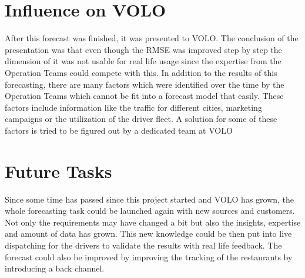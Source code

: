 \section{Influence on VOLO}
After this forecast was finished, it was presented to VOLO. The conclusion of the presentation was that even though the RMSE was improved step by step the dimension of it was not usable for real life usage since the expertise from the Operation Teams could compete with this.\newline
In addition to the results of this forecasting, there are many factors which were identified over the time by the Operation Teams which cannot be fit into a forecast model that easily. These factors include information like the traffic for different cities, marketing campaigns or the utilization of the driver fleet. A solution for some of these factors is tried to be figured out by a dedicated team at VOLO
\section{Future Tasks}
Since some time has passed since this project started and VOLO has grown, the whole forecasting task could be launched again with new sources and customers. Not only the requirements may have changed a bit but also the insights, expertise and amount of data has grown. This new knowledge could be then put into live dispatching for the drivers to validate the results with real life feedback.\newline
The forecast could also be improved by improving the tracking of the restaurants by introducing a back channel.
